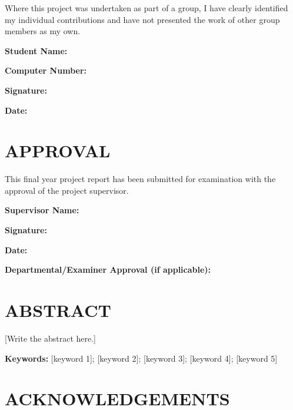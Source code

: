\documentclass[12pt,a4paper]{report}
\begin{document}
Where this project was undertaken as part of a group, I have clearly identified my individual contributions and have not presented the work of other group members as my own.

\vspace{1cm}
\noindent\textbf{Student Name:} \hrulefill

\vspace{0.5cm}
\noindent\textbf{Computer Number:} \hrulefill

\vspace{0.5cm}
\noindent\textbf{Signature:} \hrulefill

\vspace{0.5cm}
\noindent\textbf{Date:} \hrulefill

\clearpage

\chapter*{APPROVAL}

This final year project report has been submitted for examination with the approval of the project supervisor.

\vspace{1cm}
\noindent\textbf{Supervisor Name:} \hrulefill

\vspace{0.5cm}
\noindent\textbf{Signature:} \hrulefill

\vspace{0.5cm}
\noindent\textbf{Date:} \hrulefill

\vspace{1cm}
\noindent\textbf{Departmental/Examiner Approval (if applicable):} \hrulefill

\clearpage

\chapter*{ABSTRACT}

[Write the abstract here.]

\noindent\textbf{Keywords:} [keyword 1]; [keyword 2]; [keyword 3]; [keyword 4]; [keyword 5]

\clearpage

\chapter*{ACKNOWLEDGEMENTS}
\end{document}
